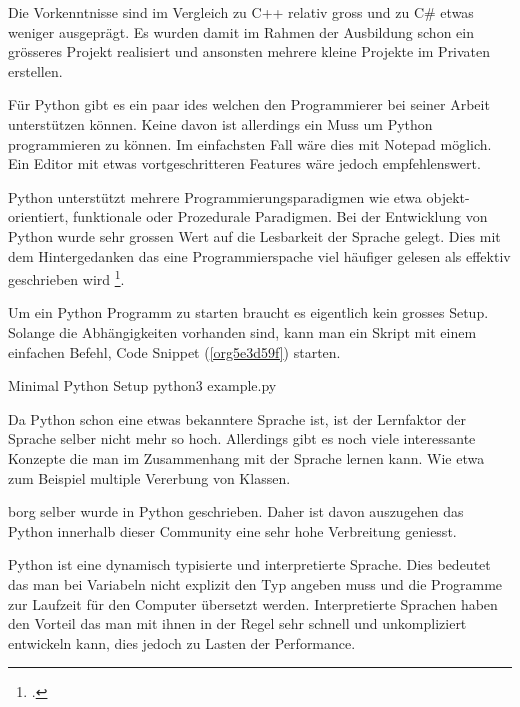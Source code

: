 Die Vorkenntnisse sind im Vergleich zu C++ relativ gross und zu C\# etwas
weniger ausgeprägt. Es wurden damit im Rahmen der Ausbildung schon ein
grösseres Projekt realisiert und ansonsten mehrere kleine Projekte im Privaten
erstellen.

Für Python gibt es ein paar \glspl{ide} welchen den Programmierer bei seiner
Arbeit unterstützen können. Keine davon ist allerdings ein Muss um Python
programmieren zu können. Im einfachsten Fall wäre dies mit Notepad möglich. Ein
Editor mit etwas vortgeschritteren Features wäre jedoch empfehlenswert.

Python unterstützt mehrere Programmierungsparadigmen wie etwa
objekt-orientiert, funktionale oder Prozedurale Paradigmen. Bei der Entwicklung
von Python wurde sehr grossen Wert auf die Lesbarkeit der Sprache gelegt. Dies
mit dem Hintergedanken das eine Programmierspache viel häufiger gelesen als
effektiv geschrieben wird \footcite{pep8}.

Um ein Python Programm zu starten braucht es eigentlich kein grosses Setup.
Solange die Abhängigkeiten vorhanden sind, kann man ein Skript mit einem
einfachen Befehl, Code Snippet (\ref{org5e3d59f}) starten.

\begin{sexylisting}{Minimal Python Setup}
python3 example.py
\end{sexylisting}

Da Python schon eine etwas bekanntere Sprache ist, ist der Lernfaktor der
Sprache selber nicht mehr so hoch. Allerdings gibt es noch viele interessante
Konzepte die man im Zusammenhang mit der Sprache lernen kann. Wie etwa zum
Beispiel multiple Vererbung von Klassen.

\gls{borg} selber wurde in Python geschrieben. Daher ist davon auszugehen das
Python innerhalb dieser Community eine sehr hohe Verbreitung geniesst.

Python ist eine dynamisch typisierte und interpretierte Sprache. Dies bedeutet
das man bei Variabeln nicht explizit den Typ angeben muss und die Programme zur
Laufzeit für den Computer übersetzt werden. Interpretierte Sprachen haben den
Vorteil das man mit ihnen in der Regel sehr schnell und unkompliziert
entwickeln kann, dies jedoch zu Lasten der Performance.

